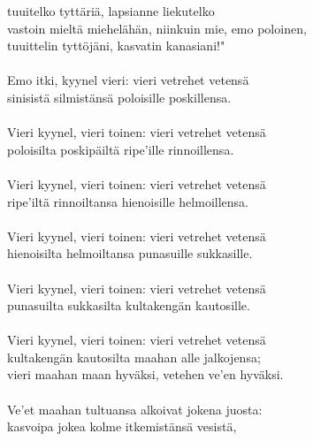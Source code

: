 tuuitelko tyttäriä, lapsianne liekutelko                       \\
vastoin mieltä miehelähän, niinkuin mie, emo poloinen,         \\
tuuittelin tyttöjäni, kasvatin kanasiani!"                     \\
                                                               \\
Emo itki, kyynel vieri: vieri vetrehet vetensä                 \\
sinisistä silmistänsä poloisille poskillensa.                  \\
                                                               \\
Vieri kyynel, vieri toinen: vieri vetrehet vetensä             \\
poloisilta poskipäiltä ripe'ille rinnoillensa.                 \\
                                                               \\
Vieri kyynel, vieri toinen: vieri vetrehet vetensä             \\
ripe'iltä rinnoiltansa hienoisille helmoillensa.               \\
                                                               \\
Vieri kyynel, vieri toinen: vieri vetrehet vetensä             \\
hienoisilta helmoiltansa punasuille sukkasille.                \\
                                                               \\
Vieri kyynel, vieri toinen: vieri vetrehet vetensä             \\
punasuilta sukkasilta kultakengän kautosille.                  \\
                                                               \\
Vieri kyynel, vieri toinen: vieri vetrehet vetensä             \\
kultakengän kautosilta maahan alle jalkojensa;                 \\
vieri maahan maan hyväksi, vetehen ve'en hyväksi.              \\
                                                               \\
Ve'et maahan tultuansa alkoivat jokena juosta:                 \\
kasvoipa jokea kolme itkemistänsä vesistä,                     \\
